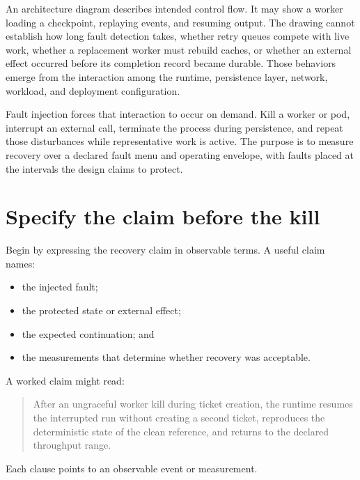 An architecture diagram describes intended control flow. It may show a worker loading a checkpoint, replaying events, and resuming output. The drawing cannot establish how long fault detection takes, whether retry queues compete with live work, whether a replacement worker must rebuild caches, or whether an external effect occurred before its completion record became durable. Those behaviors emerge from the interaction among the runtime, persistence layer, network, workload, and deployment configuration.

Fault injection forces that interaction to occur on demand. Kill a worker or pod, interrupt an external call, terminate the process during persistence, and repeat those disturbances while representative work is active. The purpose is to measure recovery over a declared fault menu and operating envelope, with faults placed at the intervals the design claims to protect.

\hypertarget{specify-the-claim-before-the-kill}{%
\section{Specify the claim before the kill}\label{specify-the-claim-before-the-kill}}


Begin by expressing the recovery claim in observable terms. A useful claim names:

\begin{itemize}
\tightlist
\item
  the injected fault;
\item
  the protected state or external effect;
\item
  the expected continuation; and
\item
  the measurements that determine whether recovery was acceptable.
\end{itemize}

A worked claim might read:

\begin{quote}
After an ungraceful worker kill during ticket creation, the runtime resumes the interrupted run without creating a second ticket, reproduces the deterministic state of the clean reference, and returns to the declared throughput range.
\end{quote}

Each clause points to an observable event or measurement.


